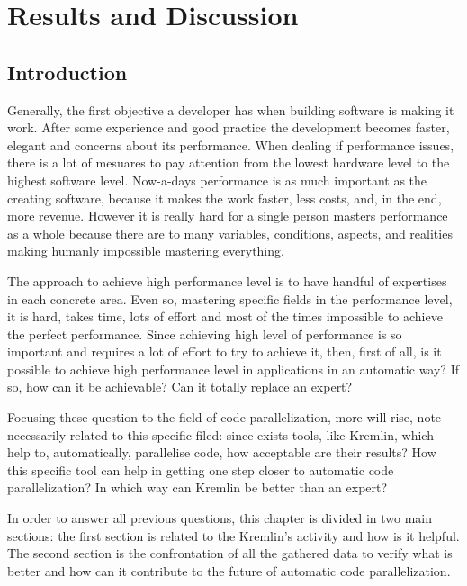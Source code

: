 \chapter{Results and Discussion}\label{chap:chap5}

\section*{}

\section{Introduction}

Generally, the first objective a developer has when building software is making it work. After some experience and good practice the development becomes faster, elegant and concerns about its performance. When dealing if performance issues, there is a lot of mesuares to pay attention from the lowest hardware level to the highest software level. Now-a-days performance is as much important as the creating software, because it makes the work faster, less costs, and, in the end, more revenue. However it is really hard for a single person masters performance as a whole because there are to many variables, conditions, aspects, and realities making humanly impossible mastering everything.

The approach to achieve high performance level is to have handful of expertises in each concrete area. Even so, mastering specific fields in the performance level, it is hard, takes time, lots of effort and most of the times impossible to achieve the perfect performance. Since achieving high level of performance is so important and requires a lot of effort to try to achieve it, then, first of all, is it possible to achieve high performance level in applications in an automatic way? If so, how can it be achievable? Can it totally replace an expert?

Focusing these question to the field of code parallelization, more will rise, note necessarily related to this specific filed: since exists tools, like Kremlin, which help to, automatically, parallelise code, how acceptable are their results? How this specific tool can help in getting one step closer to automatic code parallelization? In which way can Kremlin be better than an expert?

In order to answer all previous questions, this chapter is divided in two main sections: the first section is related to the Kremlin's activity and how is it helpful. The second section is the confrontation of all the gathered data to verify what is better and how can it contribute to the future of automatic code parallelization. 


